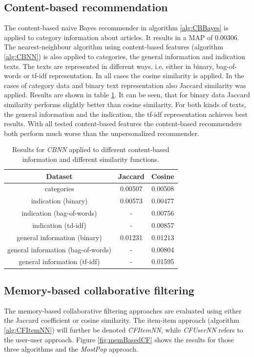 \documentclass[10pt]{reportMaster}
\begin{document}
\subsection*{Content-based recommendation}
The content-based naive Bayes recommender in algorithm \ref{alg:CBBayes} is applied to category information about articles.
It results in a MAP of 0.00306.
The nearest-neighbour algorithm using content-based features (algorithm \ref{alg:CBNN}) is also applied to categories, the general information and indication texts.
The texts are represented in different ways, i.e. either in binary, bag-of-words or tf-idf representation.
In all cases the cosine similarity is applied.
In the cases of category data and binary text representation also Jaccard similarity was applied. 
Results are shown in table \ref{tab:CBNN}.
It can be seen, that for binary data Jaccard similarity performs slightly better than cosine similarity.
For both kinds of texts, the general information and the indication, the tf-idf representation achieves best results.
With all tested content-based features the content-based recommenders both perform much worse than the unpersonalized recommender.

\begin{table}[h!]
	\begin{tabular}{|c||c|c|}
		\hline
		\textbf{Dataset}&\textbf{Jaccard}&\textbf{Cosine}\\ \hline
		categories&0.00507&0.00508\\ \hline
		indication (binary)&0.00573&0.00477\\ \hline	
		indication (bag-of-words)&-&0.00756\\ \hline	
		indication (td-idf)&-&0.00857\\ \hline	
		general information (binary)&0.01231&0.01213\\ \hline	
		general information (bag-of-words)&-&0.00804\\ \hline	
		general information (tf-idf)&-&0.01595\\ \hline	
	\end{tabular}
	\caption[Results for \textit{CBNN}]{Results for \textit{CBNN} applied to different content-based information and different similarity functions.}	
	\label{tab:CBNN}
\end{table}

\subsection*{Memory-based collaborative filtering}
The memory-based collaborative filtering approaches are evaluated using either the Jaccard coefficient or cosine similarity.
The item-item approach (algorithm \ref{alg:CFItemNN}) will further be denoted \textit{CFItemNN}, while \textit{CFUserNN} refers to the user-user approach.
Figure \ref{fig:memBasedCF} shows the results for those three algorithms and the \textit{MostPop} approach.
\end{document}
